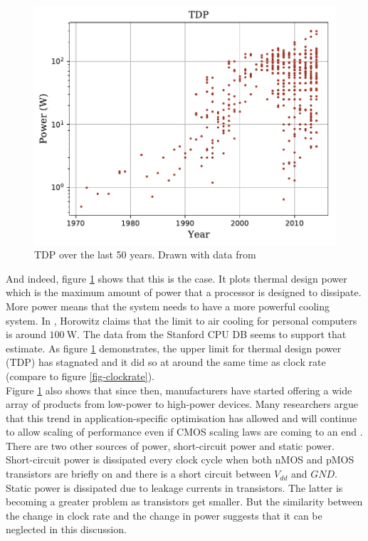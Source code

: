 \documentclass[12pt,a4paper]{article} %
\begin{document}
\begin{figure}[!t]
	\centering
	\includegraphics[width=\textwidth]{Source/TDP.pdf}
	\caption{TDP over the last 50 years. Drawn with data from \cite{cpudb}} 
	\label{fig-tdp}
\end{figure}%
And indeed, figure \ref{fig-tdp} shows that this is the case. It plots thermal design power which is the maximum amount of power that a processor is designed to dissipate. More power means that the system needs to have a more powerful cooling system. In \cite{ComputingsEnergyProblem}, Horowitz claims that the limit to air cooling for personal computers is around $\SI{100}{\watt}$. The data from the Stanford CPU DB seems to support that estimate. As figure \ref{fig-tdp} demonstrates, the upper limit for thermal design power (TDP) has stagnated and it did so at around the same time as clock rate (compare to figure \ref{fig-clockrate}). \\
Figure \ref{fig-tdp} also shows that since then, manufacturers have started offering a wide array of products from low-power to high-power devices. Many researchers argue that this trend in application-specific optimisation has allowed and will continue to allow scaling of performance even if CMOS scaling laws are coming to an end \cite{ComputingsEnergyProblem} \cite{ApplicationDependentScaling} \cite{MaintainingBenefitsWhenScalingBogsDown} \cite{PowerConstrainedCMOSScalingLimits}.\\

There are two other sources of power, short-circuit power and static power. Short-circuit power is dissipated every clock cycle when both nMOS and pMOS transistors are briefly on and there is a short circuit between $V_{dd}$ and $GND$. Static power is dissipated due to leakage currents in transistors. The latter is becoming a greater problem as transistors get smaller. But the similarity between the change in clock rate and the change in power suggests that it can be neglected in this discussion. \\
\end{document}
